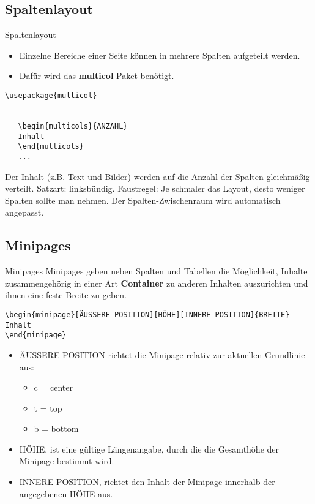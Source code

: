\subsection{Spaltenlayout}
\begin{frame}[fragile]{Spaltenlayout}
\begin{itemize}
\item Einzelne Bereiche einer Seite können in mehrere Spalten aufgeteilt werden.
\item Dafür wird das \textbf{multicol}-Paket benötigt.
\end{itemize}

\begin{lstlisting}[style=tex]
\usepackage{multicol}


   \begin{multicols}{ANZAHL}
   Inhalt
   \end{multicols}
   ...

\end{lstlisting}

{\itshape
\begin{multicols}{3}
Der Inhalt (z.B. Text und Bilder) werden auf die Anzahl der Spalten gleichmäßig verteilt. Satzart: linksbündig. Faustregel: Je schmaler das Layout, desto weniger Spalten sollte man nehmen. Der Spalten-Zwischenraum wird automatisch angepasst.
\end{multicols}}
\end{frame}

\subsection{Minipages}
\begin{frame}[fragile]{Minipages}
Minipages geben neben Spalten und Tabellen die Möglichkeit, Inhalte zusammengehörig in einer Art \textbf{Container} zu anderen Inhalten auszurichten und ihnen eine feste Breite zu geben.
\begin{lstlisting}[style=tex]
\begin{minipage}[ÄUSSERE POSITION][HÖHE][INNERE POSITION]{BREITE}
Inhalt
\end{minipage}\end{lstlisting}
\begin{itemize}
\item ÄUSSERE POSITION richtet die Minipage relativ zur aktuellen Grundlinie aus:
\begin{itemize}
\item c = center
\item t = top
\item b = bottom \newline
\end{itemize}
\item HÖHE, ist eine gültige Längenangabe, durch die die Gesamthöhe der Minipage bestimmt wird. \newline
\item INNERE POSITION, richtet den Inhalt der Minipage innerhalb der angegebenen HÖHE aus.
\end{itemize}
\end{frame}

